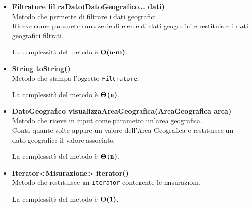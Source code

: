 \documentclass[a4paper, 12pt]{scrreprt}
\begin{document}
\begin{itemize}
				La complessit\`a del metodo \`e $\bigO\textbf{(n$\cdot$m)}$.

				\item \textbf {Filtratore filtraDato(DatoGeografico... dati)}
				\\Metodo che permette di filtrare i dati geografici.
				\\Riceve come parametro una serie di elementi dati geografici e restituisce i dati geografici filtrati.

				La complessit\`a del metodo \`e $\bigO\textbf{(n$\cdot$m)}$.

				\item \textbf {String toString()}
				\\Metodo che stampa l'oggetto \verb!Filtratore!.

				La complessit\`a del metodo \`e $\mathbf{\Theta}$\textbf{(n)}.

				\item \textbf{DatoGeografico visualizzaAreaGeografica(AreaGeografica area)}
				\\Metodo che riceve in input come parametro un'area geografica.
				\\Conta quante volte appare un valore dell'Area Geografica e restituisce un dato geografico il valore associato.

				La complessit\`a del metodo \`e $\mathbf{\Theta}$\textbf{(n)}.

				\item \textbf{Iterator<Misurazione> iterator()}
				\\Metodo che restituisce un \verb!Iterator! contenente le misurazioni.

				La complessit\`a del metodo \`e $\mathbf{O}\textbf{(1)}$.

			\end{itemize}
\end{document}
